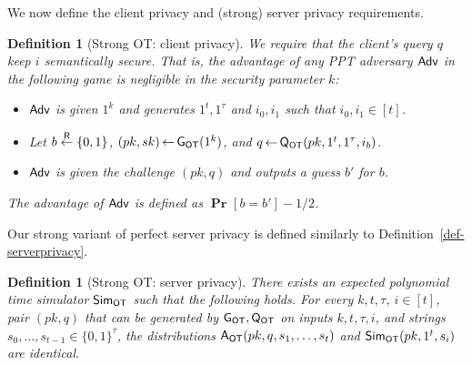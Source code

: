 \documentclass[11pt]{article}
\newtheorem{definition}[theorem]{Definition}
\newcommand{\from}{{\,\leftarrow\,}}
\newcommand{\eps}{{\epsilon}}
\newcommand{\adv}{{\sf Adv }}
\newcommand{\genot}{{\sf G_{OT}}}
\newcommand{\queot}{{\sf Q_{OT}}}
\newcommand{\ansot}{{\sf A_{OT}}}
\newcommand{\simot}{{\sf Sim_{OT}}}
\newcommand{\otl}{{\tau}}
\newcommand{\ideal}{{\sf Ideal}}
\newcommand\bp{\mbox{BP}\xspace}
\newcommand\ot{\mbox{OT}\xspace}
\newcommand{\mathify}[1]{\ifmmode{#1}\else\mbox{$#1$}\fi}
\newcommand{\set}[2][]{\mathify{{\left\{#2\right\}}^{#1}}}
\newcommand{\bools}[1][]{\set[#1]{0,1}}
\newcommand{\prob}[2][]{{\mathop{\mathbf{Pr}}_{#1}\!{\left[{#2}\right]}}}
\newcommand{\usamp}[2]{#1\stackrel{\footnotesize{\sf R}}{\leftarrow}#2}
\begin{document}
We now define the client privacy and (strong) server privacy
requirements.
\begin{definition}[Strong OT: client privacy]
We require that the client's query $q$ keep $i$ semantically secure.
That is, the advantage of any PPT adversary $\adv$ in the following
game is negligible in the security parameter $k$:
\begin{itemize}
    \item $\adv$ is given $1^k$ and generates $1^t, 1^\otl$ and
    $i_0,i_1$ such that $i_0,i_1\in{[t]}$.
    \item Let $\usamp{b}{\bools}$, $(pk,sk)\from \genot(1^k)$,
    and $q\from \queot(pk,1^t,1^\otl,i_b)$.
    \item $\adv$ is given the challenge $(pk,q)$ and outputs a guess
    $b'$ for $b$.
\end{itemize}
The advantage of $\adv$ is defined as $\prob{b=b'}-1/2$.
\end{definition}
Our strong variant of perfect server privacy is defined similarly to
Definition~\ref{def-serverprivacy}.
\begin{definition}[Strong OT: server privacy]
\label{def-ot-serv-priv} There exists an expected polynomial time
simulator $\simot$ such that the following holds. For every
$k,t,\otl$, $i\in[t]$, pair $(pk,q)$ that can be generated by
$\genot,\queot$ on inputs $k,t,\otl,i$, and strings
$s_0,\ldots,s_{t-1}\in\{0,1\}^\otl$, the distributions
$\ansot(pk,q,s_1,\ldots,s_t)$ and $\simot(pk, 1^t, s_i)$ are
identical.
\end{definition}

%
\end{document}
